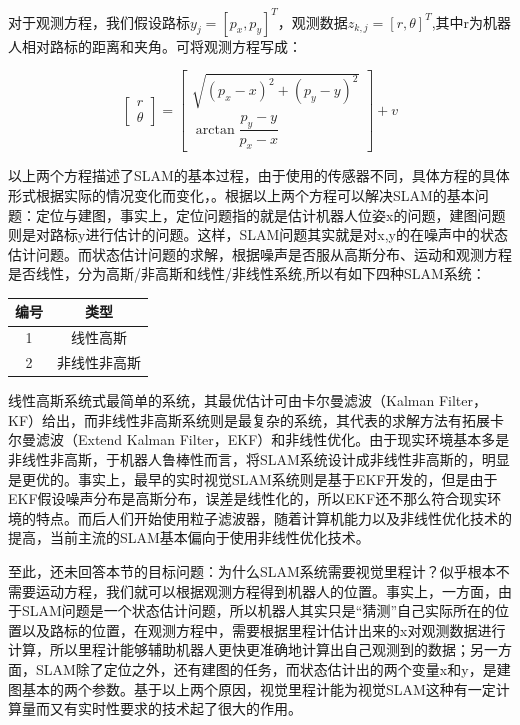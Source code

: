 \documentclass[10.5pt,twocolumn]{jbuaa}
\begin{document}
对于观测方程，我们假设路标$ y_{j} = [p_{x},p_{y}]^{T} $，观测数据$ z_{k,j} = [r,\theta]^{T} $,其中r为机器人相对路标的距离和夹角。可将观测方程写成：

\begin{equation}
\left[ \begin{array}{ccc}
r\\
\theta
\end{array} 
\right ] = \left[ \begin{array}{ccc}
\sqrt{(p_{x}-x)^2 + (p_{y}-y)^2}\\
\arctan \dfrac{p_{y}-y}{p_{x}-x}
\end{array} 
\right ] + v
\end{equation}

以上两个方程描述了SLAM的基本过程，由于使用的传感器不同，具体方程的具体形式根据实际的情况变化而变化，。根据以上两个方程可以解决SLAM的基本问题：定位与建图，事实上，定位问题指的就是估计机器人位姿x的问题，建图问题则是对路标y进行估计的问题。这样，SLAM问题其实就是对x,y的在噪声中的状态估计问题。而状态估计问题的求解，根据噪声是否服从高斯分布、运动和观测方程是否线性，分为高斯/非高斯和线性/非线性系统\cite{robust},所以有如下四种SLAM系统：

\begin{table}[h]
	\centering
	\captionnamefont{\xiaowuhao\bf }
	\captiontitlefont{\xiaowuhao\bf }
	\renewcommand\tabcolsep{1em}
	\begin{tabular}{cc}
		\toprule
		{编号} &  {类型}\\
		\midrule 
		1 & 线性高斯 \\
		2 & 非线性非高斯\\
		\bottomrule
	\end{tabular}
\end{table}

线性高斯系统式最简单的系统，其最优估计可由卡尔曼滤波（Kalman Filter，KF）给出，而非线性非高斯系统则是最复杂的系统，其代表的求解方法有拓展卡尔曼滤波（Extend Kalman Filter，EKF）和非线性优化\cite{gaoxiang14slam}。由于现实环境基本多是非线性非高斯，于机器人鲁棒性而言，将SLAM系统设计成非线性非高斯的，明显是更优的。事实上，最早的实时视觉SLAM系统则是基于EKF开发的，但是由于EKF假设噪声分布是高斯分布，误差是线性化的，所以EKF还不那么符合现实环境的特点。而后人们开始使用粒子滤波器，随着计算机能力以及非线性优化技术的提高，当前主流的SLAM基本偏向于使用非线性优化技术。

至此，还未回答本节的目标问题：为什么SLAM系统需要视觉里程计？似乎根本不需要运动方程，我们就可以根据观测方程得到机器人的位置。事实上，一方面，由于SLAM问题是一个状态估计问题，所以机器人其实只是“猜测”自己实际所在的位置以及路标的位置，在观测方程中，需要根据里程计估计出来的x对观测数据进行计算，所以里程计能够辅助机器人更快更准确地计算出自己观测到的数据；另一方面，SLAM除了定位之外，还有建图的任务，而状态估计出的两个变量x和y，是建图基本的两个参数。基于以上两个原因，视觉里程计能为视觉SLAM这种有一定计算量而又有实时性要求的技术起了很大的作用。
\end{document}

